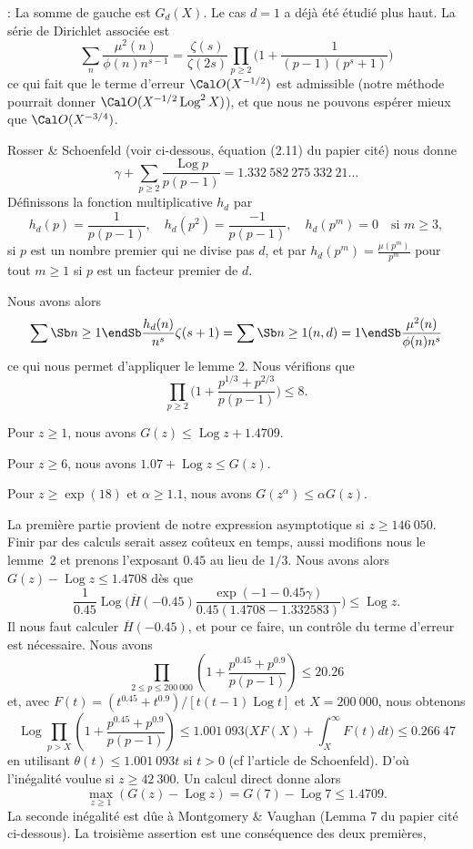 \documentclass[12pt,a4paper,twoside]{article}
\DeclareMathOperator{\Log}{Log}
\begin{document}
 :
La somme de gauche est $G_d(X)$. Le cas $d=1$ a d\'ej\`a \'et\'e
\'etudi\'e plus haut. La s\'erie de Dirichlet associ\'ee est
$$
\sum_{n}\frac{\mu^2(n)}{\phi(n)n^{s-1}}=
\frac{\zeta(s)}{\zeta(2s)}
\prod_{p\ge2}
\bigg(
1+\frac1{(p-1)(p^s+1)}
\bigg)
$$
ce qui fait que le terme d'erreur $\Cal O(X^{-1/2})$ est admissible
(notre m\'ethode pourrait donner $\Cal O(X^{-1/2}\Log^2X)$), et que
nous ne pouvons esp\'erer mieux que $\Cal O(X^{-3/4})$.
\bigskip

Rosser \& Schoenfeld (voir ci-dessous, \'equation (2.11) du papier
cit\'e) nous donne
$$
\gamma+\sum_{p\ge2}\frac{\Log p}{p(p-1)}=
1.332\ 582\ 275\ 332\ 21...
$$
D\'efinissons la fonction multiplicative $h_d$ par
$$
h_d(p)=\frac1{p(p-1)},
\quad h_d(p^2)=\frac{-1}{p(p-1)},
\quad h_d(p^m)=0
\quad \text{si\ \ }m\ge3,
$$
si $p$ est un nombre premier qui ne divise pas $d$,
et par $h_d(p^m)=\frac{\mu(p^m)}{p^m}$ pour tout
$m\ge1$ si $p$ est un facteur premier de $d$.

Nous avons alors
$$
\sum\Sb n\ge1\endSb\frac{h_d(n)}{n^s}\zeta(s+1)=
\sum\Sb n\ge1\\ (n,d)=1\endSb\frac{\mu^2(n)}{\phi(n)n^s}
$$
ce qui nous permet d'appliquer le lemme 2. Nous v\'erifions que
$$
\prod_{p\ge2}
\bigg(1+\frac{p^{1/3}+p^{2/3}}{p(p-1)}\bigg)
\le8.
$$
\fin

\roster
\item Pour $z\ge1$, nous avons $G(z)\le\Log z+1.4709$.
\item Pour $z\ge6$, nous avons $1.07+\Log z\le G(z)$.
\item Pour $z\ge\exp(18)$ et $\alpha\ge1.1$, nous avons $G(z^\alpha)\le\alpha G(z)$.
\endroster
\endproclaim

La premi\`ere partie provient de notre expression asymptotique si $z\ge146\ 050$.
Finir par des calculs serait assez co\^uteux en temps, aussi modifions
nous le lemme~2 et prenons l'exposant $0.45$ au lieu de $1/3$. Nous
avons alors $G(z)-\Log z\le1.4708$ d\`es que
$$
\frac1{0.45}\Log\big(\overline{H}(-0.45)
\frac{\exp(-1-0.45\gamma)}{0.45(1.4708-1.332583)}\big)\le\Log z.
$$
Il nous faut calculer $\overline{H}(-0.45)$, et pour ce faire, un
contr\^ole du terme d'erreur est n\'ecessaire.
Nous avons
$$
\prod_{2\le p\le200\ 000}(1+\frac{p^{0.45}+p^{0.9}}{p(p-1)})\le20.26
$$
et, avec $F(t)=(t^{0.45}+t^{0.9})/[t(t-1)\Log t]$ et $X=200\ 000$,
nous obtenons
$$
\Log\prod_{p>X}(1+\frac{p^{0.45}+p^{0.9}}{p(p-1)})\le
1.001\ 093\big(XF(X)+\int_X^{\infty}F(t)dt\big)\le0.266\ 47
$$
en utilisant $\theta(t)\le1.001\ 093t$ si $t>0$ (cf l'article de Schoenfeld).
D'o\`u l'in\'egalit\'e voulue si $z\ge42\ 300$.
Un calcul direct donne alors
$$
\max_{z\ge1}(G(z)-\Log z)=G(7)-\Log 7\le1.4709.
$$
La seconde in\'egalit\'e est d\^ue \`a Montgomery \& Vaughan
(Lemma 7 du papier cit\'e ci-dessous). La troisi\`eme assertion est
une cons\'equence des deux premi\`eres,
\fin
\end{document}
